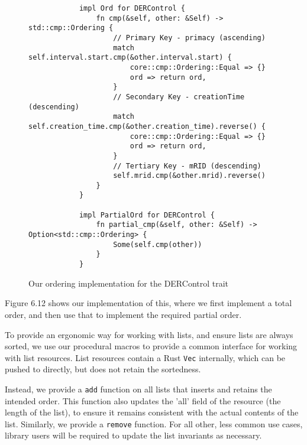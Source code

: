 \begin{figure}[H]
    \begin{center}
        \begin{lstlisting}
            impl Ord for DERControl {
                fn cmp(&self, other: &Self) -> std::cmp::Ordering {
                    // Primary Key - primacy (ascending)
                    match self.interval.start.cmp(&other.interval.start) {
                        core::cmp::Ordering::Equal => {}
                        ord => return ord,
                    }
                    // Secondary Key - creationTime (descending)
                    match self.creation_time.cmp(&other.creation_time).reverse() {
                        core::cmp::Ordering::Equal => {}
                        ord => return ord,
                    }
                    // Tertiary Key - mRID (descending)
                    self.mrid.cmp(&other.mrid).reverse()
                }
            } 

            impl PartialOrd for DERControl {
                fn partial_cmp(&self, other: &Self) -> Option<std::cmp::Ordering> {
                    Some(self.cmp(other))
                }
            }
        \end{lstlisting}
        \label{fig:dercord}
        \caption{Our ordering implementation for the DERControl trait}
    \end{center}
\end{figure}

Figure 6.12 shows our implementation of this, where we first implement a total order, and then use that to implement the required partial order.

To provide an ergonomic way for working with lists, and ensure lists are always sorted, we use our procedural macros to provide a common interface for working with list resources. List resources contain a Rust \texttt{Vec} internally, which can be pushed to directly, but does not retain the sortedness.

Instead, we provide a \texttt{add} function on all lists that inserts and retains the intended order. This function also updates the 'all' field of the resource (the length of the list), to ensure it remains consistent with the actual contents of the list. Similarly, we provide a \texttt{remove} function. For all other, less common use cases, library users will be required to update the list invariants as necessary. 

